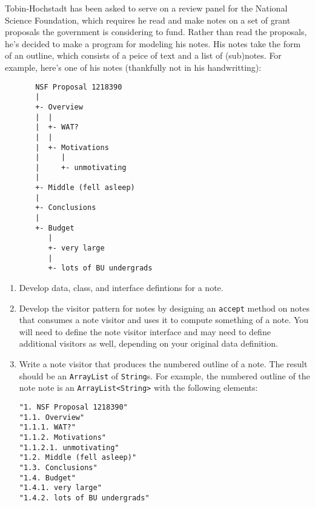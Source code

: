 \documentclass[12pt]{article}                   %
\def\pts#1{\marginpar{\footnotesize \raggedright  \fbox{#1 {\sc Points}}}}
\begin{document}
\ifrubric
\else
{}
\fi
\newpage


\begin{problem} \pts{20}
\noindent
Tobin-Hochstadt has been asked to serve on a review panel for the
National Science Foundation, which requires he read and make notes on
a set of grant proposals the government is considering to fund.
Rather than read the proposals, he's decided to make a program for
modeling his notes.  His notes take the form of an outline, which
consists of a peice of text and a list of (sub)notes.  For example,
here's one of his notes (thankfully not in his handwritting):
\begin{verbatim}
       NSF Proposal 1218390
       |
       +- Overview
       |  |
       |  +- WAT?
       |  |
       |  +- Motivations
       |     |
       |     +- unmotivating
       |
       +- Middle (fell asleep)
       |
       +- Conclusions
       |
       +- Budget
          |
          +- very large
          |
          +- lots of BU undergrads
\end{verbatim}


\newpage

\begin{enumerate}

\item Develop data, class, and interface defintions for a note.

\newpage

\noindent
\item Develop the visitor pattern for notes by designing
  an \texttt{accept} method on notes that
  consumes a note visitor and uses it to compute something of a note.
  You will need to define the note visitor interface and may need to
  define additional visitors as well, depending on your original data
  definition.

\newpage

\noindent
\item Write a note visitor that produces the numbered outline of a
  note.  The result should be an \texttt{ArrayList} of
  \texttt{String}s.  For example, the numbered outline of the note
  note is an \texttt{ArrayList<String>} with the following elements:

\begin{verbatim}
"1. NSF Proposal 1218390"
"1.1. Overview"
"1.1.1. WAT?"
"1.1.2. Motivations"
"1.1.2.1. unmotivating"
"1.2. Middle (fell asleep)"
"1.3. Conclusions"
"1.4. Budget"
"1.4.1. very large"
"1.4.2. lots of BU undergrads"
\end{verbatim}


\end{enumerate}
\end{problem}
\end{document}
